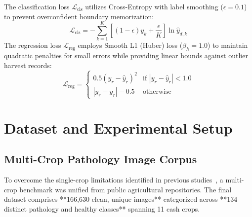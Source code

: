 \documentclass[conference]{IEEEtran}
\begin{document}
The classification loss $\mathcal{L}_{\text{cls}}$ utilizes Cross-Entropy with label smoothing ($\epsilon = 0.1$) to prevent overconfident boundary memorization:
\begin{equation}
    \mathcal{L}_{\text{cls}} = -\sum_{k=1}^K \left[ (1 - \epsilon) y_k + \frac{\epsilon}{K} \right] \ln \hat{y}_{d,k}
\end{equation}
The regression loss $\mathcal{L}_{\text{reg}}$ employs Smooth L1 (Huber) loss ($\beta_h = 1.0$) to maintain quadratic penalties for small errors while providing linear bounds against outlier harvest records:
\begin{equation}
    \mathcal{L}_{\text{reg}} = \begin{cases} 
      0.5 (y_r - \hat{y}_r)^2 & \text{if } |y_r - \hat{y}_r| < 1.0 \\
      |y_r - \hat{y}_r| - 0.5 & \text{otherwise}
   \end{cases}
\end{equation}

\section{Dataset and Experimental Setup}

\subsection{Multi-Crop Pathology Image Corpus}
To overcome the single-crop limitations identified in previous studies~\cite{almadhor2023, zhu2025, khan2024}, a multi-crop benchmark was unified from public agricultural repositories. The final dataset comprises **166,630 clean, unique images** categorized across **134 distinct pathology and healthy classes** spanning 11 cash crops.
\end{document}
